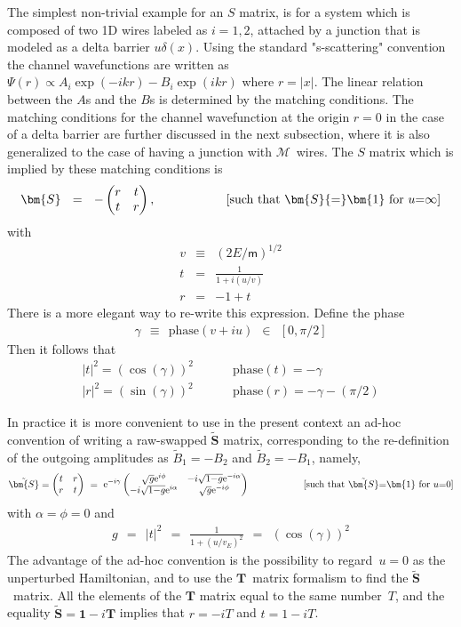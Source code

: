 \documentclass[onecolumn,fleqn, 11pt]{revtex4}
\newcommand{\eexp}{\mathrm{e}^}
\newcommand{\mass}{\mathsf{m}}
\newcommand{\amatrix}[1]{\begin{matrix} #1 \end{matrix}}
\newcommand{\beq}{\begin{eqnarray}}
\newcommand{\eeq}{\end{eqnarray}}
\begin{document}
The simplest non-trivial example for an $S$ matrix, 
is for a system which is composed of two 1D wires 
labeled as ${i=1,2}$, attached by a junction
that is modeled as a delta barrier $u\delta(x)$.   
Using the standard "s-scattering" convention 
the channel wavefunctions are written 
as  ${\Psi(r) \propto A_i\exp(-ikr)-B_i\exp(ikr)}$ 
where ${r=|x|}$. The linear relation between 
the $A$s and the $B$s is determined by the 
matching conditions. The matching conditions 
for the channel wavefunction at the origin ${r=0}$ 
in the case of a delta barrier are further discussed 
in the next subsection, where it is also generalized 
to the case of having a junction with $\mathcal{M}$~wires.   
The $S$ matrix which is implied by these matching 
conditions is  
\beq
\bm{S} \ \ = \ \ -\left(
\amatrix{
r & t \cr
t & r
}\right), 
\ \ \ \ \ \ \ \ \ \ \ \ \ \ \ \ \  
\mbox{[such that $\bm{S}{=}\bm{1}$ for $u{=}\infty$]}
\eeq
with
\beq
v &\equiv& (2E/\mass)^{1/2} \\
t &=& \frac{1}{1+i(u/v)} \\
r &=& -1+t 
\eeq
There is a more elegant way to re-write this expression.
Define the phase 
\beq
\gamma \ \ \equiv \ \ \mbox{phase}(v+iu) \ \ \in \ \ [0,\pi/2]
\eeq
Then it follows that 
\beq
|t|^2 = (\cos(\gamma))^2  \ \ \ \ \ \ \ && \mbox{phase}(t) = -\gamma \\
|r|^2 = (\sin(\gamma))^2  \ \ \ \ \ \ \ && \mbox{phase}(r) = -\gamma -(\pi/2)
\eeq

In practice it is more convenient to use 
in the present context an ad-hoc convention 
of writing a raw-swapped $\tilde{\bm{S}}$ matrix,  
corresponding to the re-definition of the outgoing 
amplitudes as ${\tilde{B}_1=-B_2}$
and ${\tilde{B}_2=-B_1}$, namely, 
\beq
\tilde{\bm{S}} = \left(
\amatrix{
t & r \cr
r & t
}\right)
 \,\,=\,\,
\eexp{-i\gamma} \left(
\amatrix{
\sqrt{g} \eexp{i\phi}  & -i\sqrt{1{-}g}\eexp{-i\alpha} \cr
-i\sqrt{1{-}g}\eexp{i\alpha} & \sqrt{g}\eexp{-i\phi} 
}\right)
\ \ \ \ \ \ \ \ \ \ \ \ \ \ \ \ \  
\mbox{[such that $\tilde{\bm{S}}{=}\bm{1}$ for $u{=}0$]}
\eeq
with $\alpha=\phi=0$ and 
\beq
g \ \ = \ \ |t|^2 \ \ = \ \ \frac{1}{1+(u/v_E)^2} \ \ = \ \ (\cos(\gamma))^2 
\eeq
The advantage of the ad-hoc convention 
is the possibility to regard~${u=0}$ as 
the unperturbed Hamiltonian, and to use 
the $\bm{T}$~matrix formalism to find the $\tilde{\bm{S}}$~matrix.
All the elements of the $\bm{T}$ matrix equal 
to the same number~$T$, and the equality 
${\tilde{\bm{S}}=\bm{1}-i\bm{T}}$ implies 
that ${r=-iT}$ and ${t=1-iT}$.
\end{document}
